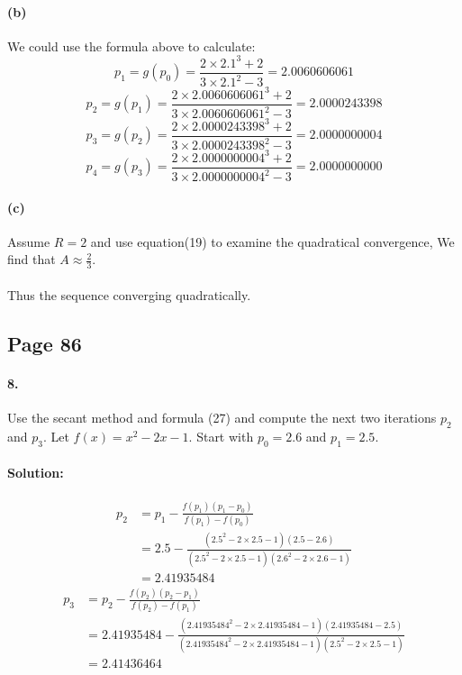 \documentclass{article}  %
\begin{document}
        \paragraph{(b)}We could use the formula above to calculate:
        $$p_1 = g(p_0) = \frac{2 \times 2.1^3 + 2}{3 \times 2.1^2 - 3} = 2.0060606061$$
        $$p_2 = g(p_1) = \frac{2 \times 2.0060606061^3 + 2}{3 \times 2.0060606061^2 - 3} = 2.0000243398$$
        $$p_3 = g(p_2) = \frac{2 \times 2.0000243398^3 + 2}{3 \times 2.0000243398^2 - 3} = 2.0000000004$$
        $$p_4 = g(p_3) = \frac{2 \times 2.0000000004^3 + 2}{3 \times 2.0000000004^2 - 3} = 2.0000000000$$        
        \paragraph{(c)}Assume $R = 2$ and use equation(19) to examine the quadratical convergence, We find that $A \approx \frac{2}{3}$.
        \paragraph{}Thus the sequence converging quadratically.
        \subsection*{Page 86}
        \paragraph{8.}Use the secant method and formula (27) and compute the next two iterations $p_2$ and $p_3$. Let $f(x) = x^2 - 2x - 1$. Start with $p_0 = 2.6$ and $p_1 = 2.5$. 
        \paragraph{Solution:}
        \begin{align*}
        p_2 &= p_1 - \frac{f(p_1)(p_1 - p_0)}{f(p_1) - f(p_0)} \\
        &= 2.5 - \frac{(2.5^2 - 2 \times 2.5 -1)(2.5 - 2.6)}{(2.5^2 - 2 \times 2.5 -1)(2.6^2 - 2 \times 2.6 -1)} \\ 
        &= 2.41935484
        \end{align*}
        \begin{align*}
        p_3 &= p_2 - \frac{f(p_2)(p_2 - p_1)}{f(p_2) - f(p_1)} \\
        &= 2.41935484 - \frac{(2.41935484^2 - 2 \times 2.41935484 -1)(2.41935484 - 2.5)}{(2.41935484^2 - 2 \times 2.41935484 -1)(2.5^2 - 2 \times 2.5 -1)} \\ 
        &= 2.41436464
        \end{align*}
\end{document}
